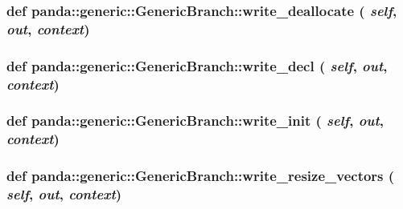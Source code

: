 \label{classpanda_1_1generic_1_1GenericBranch_ab14b2d4bccc10621173e87c9ae95e8c2}
\hypertarget{classpanda_1_1generic_1_1GenericBranch_a455c3bc1f6dfbf0d00e5a68f8e79bd27}{
\subsubsection[{write\_\-deallocate}]{\setlength{\rightskip}{0pt plus 5cm}def panda::generic::GenericBranch::write\_\-deallocate ( {\em self}, \/   {\em out}, \/   {\em context})}}
\label{classpanda_1_1generic_1_1GenericBranch_a455c3bc1f6dfbf0d00e5a68f8e79bd27}
\hypertarget{classpanda_1_1generic_1_1GenericBranch_a21550a6ea551dc0bd68b730c2f8d62f9}{
\subsubsection[{write\_\-decl}]{\setlength{\rightskip}{0pt plus 5cm}def panda::generic::GenericBranch::write\_\-decl ( {\em self}, \/   {\em out}, \/   {\em context})}}
\label{classpanda_1_1generic_1_1GenericBranch_a21550a6ea551dc0bd68b730c2f8d62f9}
\hypertarget{classpanda_1_1generic_1_1GenericBranch_a202afea2ac9cb487881dc7146d4a523b}{
\subsubsection[{write\_\-init}]{\setlength{\rightskip}{0pt plus 5cm}def panda::generic::GenericBranch::write\_\-init ( {\em self}, \/   {\em out}, \/   {\em context})}}
\label{classpanda_1_1generic_1_1GenericBranch_a202afea2ac9cb487881dc7146d4a523b}
\hypertarget{classpanda_1_1generic_1_1GenericBranch_a63ead987de9ee2075c2ca202c6b7c129}{
\subsubsection[{write\_\-resize\_\-vectors}]{\setlength{\rightskip}{0pt plus 5cm}def panda::generic::GenericBranch::write\_\-resize\_\-vectors ( {\em self}, \/   {\em out}, \/   {\em context})}}
